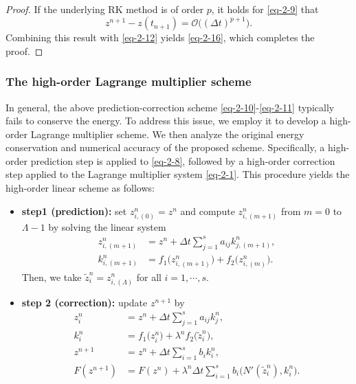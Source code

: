 \documentclass[onefignum,onetabnum]{siamart}
\begin{document}
\begin{proof}
If the underlying RK method is of order $p$, it holds for \eqref{eq-2-9} that
\begin{equation*}
	z^{n+1}-z(t_{n+1})=\mathcal{O}\big((\Delta t)^{p+1}\big).
\end{equation*} 
Combining this result with \eqref{eq-2-12} yields \eqref{eq-2-16}, which completes the proof.
\end{proof}

\subsubsection{The high-order Lagrange multiplier scheme}
In general, the above prediction-correction scheme \eqref{eq-2-10}-\eqref{eq-2-11} typically fails to conserve the energy. To address this issue, we employ it to develop a high-order Lagrange multiplier scheme. We then analyze the original energy conservation and numerical accuracy of the proposed scheme. Specifically, a high-order prediction step is applied to \eqref{eq-2-8}, followed by a high-order correction step applied to the Lagrange multiplier system \eqref{eq-2-1}. This procedure yields the high-order linear scheme as follows:
\begin{algorithm}[H]
\begin{itemize}
	\item[{\textbf{$\star$}}]\textbf{step1 (prediction):} set $z_{i,(0)}^n=z^n$ and compute $z_{i,(m+1)}^n$ from $m=0$ to $\Lambda-1$ by solving the linear system
	\begin{equation}\label{eq-2-17}
		\begin{aligned}
			z_{i,(m+1)}^n&=z^n+\Delta t\sum_{j=1}^sa_{ij}k_{j,(m+1)}^n,\\ k_{i,(m+1)}^n&=f_1\big(z_{i,(m+1)}^n\big)+f_2\big(z_{i,(m)}^n\big).
		\end{aligned}
	\end{equation}
	Then, we take $\tilde{z}_i^n=z_{i,(\Lambda)}^n$ for all $i=1,\cdots,s$.
	\item[{\textbf{$\star$}}]\textbf{step 2 (correction):} update $z^{n+1}$ by
	\begin{equation}\label{eq-2-18}
		\begin{aligned}
			z_i^n&=z^n+\Delta t\sum_{j=1}^sa_{ij}k_j^n,\\
			k_i^n&=f_1\big(z_i^n\big)+\lambda^nf_2\big(\tilde{z}_i^n\big),\\
			z^{n+1}&=z^n+\Delta t\sum_{i=1}^sb_ik_i^n,\\
			F(z^{n+1})&=F(z^n)+\lambda^n\Delta t\sum_{i=1}^sb_i\big(N'(\tilde{z}_i^n),k_i^n\big).
		\end{aligned}
	\end{equation}
\end{itemize}
\end{algorithm}
\end{document}
